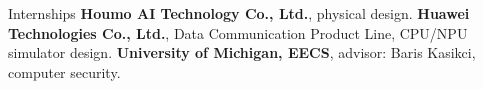 \begin{rubric}{Internships}
%
	\textbf{Houmo AI Technology Co., Ltd.}, physical design.
%
%
	\textbf{Huawei Technologies Co., Ltd.}, Data Communication Product Line, CPU/NPU simulator design.
%
%
	\textbf{University of Michigan, EECS}, advisor: Baris Kasikci, computer security.
%
\end{rubric}
